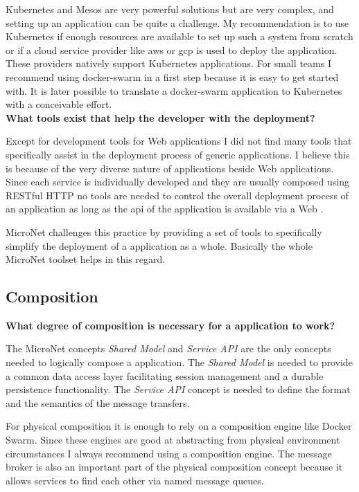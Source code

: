 Kubernetes and Mesos are very powerful solutions but are very complex, and
setting up an application can be quite a challenge. My recommendation is to use
Kubernetes if enough resources are available to set up such a system from
scratch or if a cloud service provider like \gls{aws} or \gls{gcp} is used to
deploy the application. These providers natively support Kubernetes
applications. For small teams I recommend using docker-swarm in a first step
because it is easy to get started with. It is later possible to translate a
docker-swarm application to Kubernetes with a conceivable effort.\\

\noindent
\textbf{What tools exist that help the developer with the deployment?}

Except for development tools for Web applications I did not find many tools that
specifically assist in the deployment process of generic \ms{} applications. I
believe this is because of the very diverse nature of \ms{} applications beside
Web applications. Since each service is individually developed and they are
usually composed using RESTful HTTP no tools are needed to control the overall
deployment process of an application as long as the \gls{api} of the application
is available via a Web \ms{}.

MicroNet challenges this practice by providing a set of tools to specifically
simplify the deployment of a \ms{} application as a whole. Basically the whole
MicroNet toolset helps in this regard.

\subsection{\msuc{} Composition}

\noindent
\textbf{What degree of composition is necessary for a \ms{} application
to work?}

The MicroNet concepts \textit{Shared Model} and \textit{Service API} are the
only concepts needed to logically compose a \ms{} application. The
\textit{Shared Model} is needed to provide a common data access layer
facilitating session management and a durable persistence functionality. The
\textit{Service API} concept is needed to define the format and the semantics of
the message transfers.

For physical composition it is enough to rely on a composition engine like
Docker Swarm. Since these engines are good at abstracting from physical
environment circumstances I always recommend using a composition engine. The
message broker is also an important part of the physical composition concept
because it allows services to find each other via named message queues.\\

